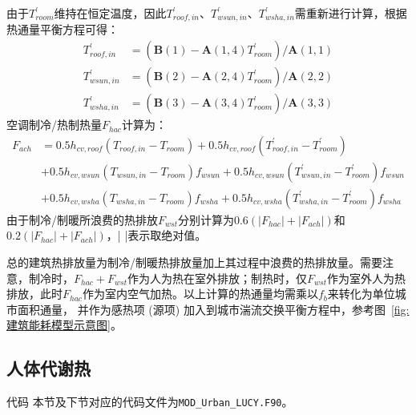由于$T_{room}^\prime$维持在恒定温度，因此$T_{roof,in}^\prime$、$T_{wsun,in}^\prime$、$T_{wsha,in}^\prime$需重新进行计算，根据热通量平衡方程可得：
\begin{equation}
\begin{aligned}
T_{roof,in}^\prime & = \left ( \mathbf{B}\left(1\right)-\mathbf{A}\left(1,4\right)T_{room}^\prime\right) / \mathbf{A}\left(1,1\right) \\
T_{wsun,in}^\prime & = \left ( \mathbf{B}\left(2\right)-\mathbf{A}\left(2,4\right)T_{room}^\prime\right) / \mathbf{A}\left(2,2\right) \\
T_{wsha,in}^\prime & = \left ( \mathbf{B}\left(3\right)-\mathbf{A}\left(3,4\right)T_{room}^\prime\right) / \mathbf{A}\left(3,3\right)
\end{aligned}
\end{equation}
空调制冷/热制热量$F_{hac}$计算为：
\begin{equation}
\begin{aligned}
F_{ach} & = 0.5h_{cv,roof}\left(T_{roof,in}-T_{room}\right) + 0.5h_{cv,roof}\left(T_{roof,in}^\prime-T_{room}^\prime\right) \\
& + 0.5h_{cv,wsun}\left(T_{wsun,in}-T_{room}\right)f_{wsun} + 0.5h_{cv,wsun}\left(T_{wsun,in}^\prime-T_{room}^\prime\right)f_{wsun} \\
& + 0.5h_{cv,wsha}\left(T_{wsha,in}-T_{room}\right)f_{wsha} + 0.5h_{cv,wsha}\left(T_{wsha,in}^\prime-T_{room}^\prime\right)f_{wsha}
\end{aligned}
\end{equation}
由于制冷/制暖所浪费的热排放$F_{wst}$分别计算为$0.6\left( |F_{hac}|+|F_{ach}|\right)$和$0.2\left( |F_{hac}|+|F_{ach}|\right)$，| |表示取绝对值。

总的建筑热排放量为制冷/制暖热排放量加上其过程中浪费的热排放量。需要注意，制冷时，$F_{hac}+F_{wst}$作为人为热在室外排放；制热时，仅$F_{wst}$作为室外人为热排放，此时$F_{hac}$作为室内空气加热。以上计算的热通量均需乘以$f_b$来转化为单位城市面积通量，
并作为感热项 (源项) 加入到城市湍流交换平衡方程中，参考图~\ref{fig:建筑能耗模型示意图}。

\subsection{人体代谢热}

\begin{mymdframed}{代码}
本节及下节对应的代码文件为\texttt{MOD\_Urban\_LUCY.F90}。
\end{mymdframed}

